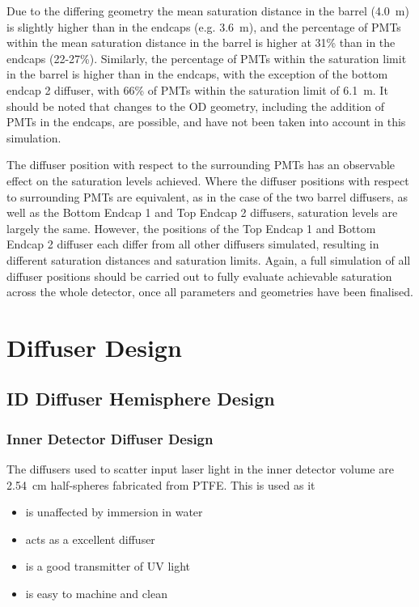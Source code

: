 \documentclass[a4paper,11pt]{article}
\begin{document}
Due to the differing geometry the mean saturation distance in the barrel (4.0~m) is slightly higher than in the endcaps (e.g. 3.6~m), and the percentage of PMTs within the mean saturation distance in the barrel is higher at 31\% than in the endcaps (22-27\%). Similarly, the percentage of PMTs within the saturation limit in the barrel is higher than in the endcaps, with the exception of the bottom endcap 2 diffuser, with 66\% of PMTs within the saturation limit of 6.1~m. It should be noted that changes to the OD geometry, including the addition of PMTs in the endcaps, are possible, and have not been taken into account in this simulation. 

The diffuser position with respect to the surrounding PMTs has an observable effect on the saturation levels achieved. Where the diffuser positions with respect to surrounding PMTs are equivalent, as in the case of the two barrel diffusers, as well as the Bottom Endcap 1 and Top Endcap 2 diffusers, saturation levels are largely the same. However, the positions of the Top Endcap 1 and Bottom Endcap 2 diffuser each differ from all other diffusers simulated, resulting in different saturation distances and saturation limits.   Again, a full simulation of all diffuser positions should be carried out to fully evaluate achievable saturation across the whole detector, once all parameters and geometries have been finalised.

\section{Diffuser Design}\label{sec:diffuser}
\subsection{ID Diffuser Hemisphere Design}
\subsubsection{Inner Detector Diffuser Design}

The diffusers used to scatter input laser light in the inner detector volume are 2.54~cm half-spheres fabricated from PTFE. This is used as it
\begin{itemize}
\item is unaffected by immersion in water
\item acts as a excellent diffuser
\item is a good transmitter of UV light
\item is easy to machine and clean
\end{itemize}
\end{document}
